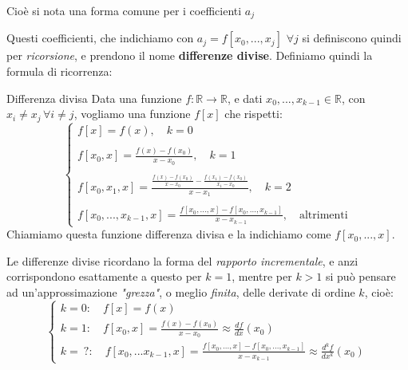 \documentclass[a4paper,11pt]{article}
\begin{document}
Cioè si nota una forma comune per i coefficienti $a_j$

\par\smallskip

Questi coefficienti, che indichiamo con $a_j = f[x_0, ..., x_j]$ $\forall j$ si definiscono quindi per \textit{ricorsione}, e prendono il nome \textbf{differenze divise}.
Definiamo quindi la formula di ricorrenza:
\begin{definition}{Differenza divisa}
	Data una funzione $f: \mathbb{R} \rightarrow \mathbb{R}$, e dati $x_0, ..., x_{k - 1} \in \mathbb{R}$, con $x_i \neq x_j \, \forall i \neq j$, vogliamo una funzione $f[x]$ che rispetti:
	\[
		\begin{cases}
			f[x] = f(x), \quad k = 0 \\ \\
			f[x_0, x] = \frac{f(x) - f(x_0)}{x - x_0}, \quad k = 1 \\ \\
			f[x_0, x_1, x] = \frac{ \frac{f(x) - f(x_0)}{x - x_0} - \frac{f(x_1) - f(x_0)}{x_1 - x_0} }{x - x_1}, \quad k = 2 \\ \\
			f[x_0, ... , x_{k - 1}, x] = \frac{ f[x_0, ..., x] - f[x_0, ..., x_{k - 1}] }{ x - x_{k - 1} }, \quad \text{altrimenti}
		\end{cases}
	\]
	Chiamiamo questa funzione differenza divisa e la indichiamo come $f[x_0, ..., x ]$.
\end{definition}

Le differenze divise ricordano la forma del \textit{rapporto incrementale}, e anzi corrispondono esattamente a questo per $k = 1$, mentre per $k>1$ si può pensare ad un'approssimazione \textit{"grezza"}, o meglio \textit{finita},  delle derivate di ordine $k$, cioè:
\[
	\begin{cases}
		k = 0 : \quad f[x] = f(x)  \\
		k = 1 : \quad f[x_0, x] = \frac{f(x) - f(x_0)}{x - x_0} \approx \frac{df}{dx}(x_0) \\
		k = \ ? : \quad f[x_0, ... x_{k - 1}, x] = \frac{ f[x_0, ..., x] - f[x_0, ..., x_{k - 1}] }{ x - x_{k - 1} } \approx \frac{d^{k}f}{dx^{k}}(x_0) 
	\end{cases}
\]
\end{document}
